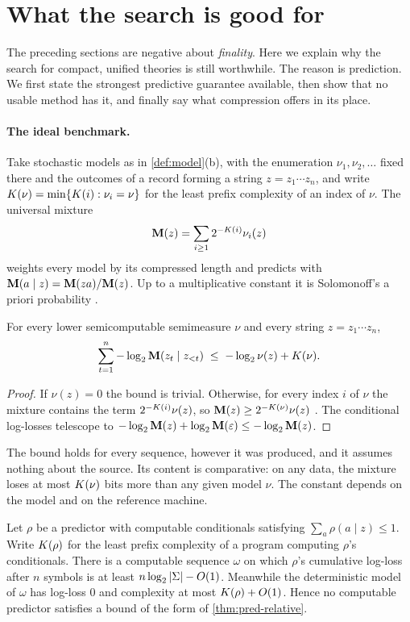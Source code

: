 \section{What the search is good for}\label{sec:predict}

The preceding sections are negative about \emph{finality}. Here we explain why the
search for compact, unified theories is still worthwhile. The reason is prediction. We
first state the strongest predictive guarantee available, then show that no usable
method has it, and finally say what compression offers in its place.

\paragraph{The ideal benchmark.}
Take stochastic models as in \cref{def:model}(b), with the enumeration
$\nu_1,\nu_2,\ldots$ fixed there and the outcomes of a record forming a string
$z=z_1\cdots z_n$, and write $K(\nu)=\min\{K(i):\nu_i=\nu\}$ for
the least prefix complexity of an index of $\nu$. The universal mixture
\[
  \mathbf{M}(z)=\sum_{i\ge1}2^{-K(i)}\nu_i(z)
\]
weights every model by its compressed length and predicts with
$\mathbf{M}(a\mid z)=\mathbf{M}(za)/\mathbf{M}(z)$. Up to a multiplicative constant it is Solomonoff's
a priori probability \citep{solomonoff1978,li-vitanyi2019}.

\begin{theorem}\label{thm:pred-relative}
For every lower semicomputable semimeasure $\nu$ and every string $z=z_1\cdots z_n$,
\[
  \sum_{t=1}^{n}-\log_2\mathbf{M}(z_t\mid z_{<t})\;\le\;-\log_2\nu(z)+K(\nu).
\]
\end{theorem}

\begin{proof}
If $\nu(z)=0$ the bound is trivial. Otherwise, for every index $i$ of $\nu$ the mixture
contains the term $2^{-K(i)}\nu(z)$, so $\mathbf{M}(z)\ge2^{-K(\nu)}\nu(z)$
\citep[Ch.~4]{li-vitanyi2019}. The conditional
log-losses telescope to $-\log_2\mathbf{M}(z)+\log_2\mathbf{M}(\varepsilon)\le-\log_2\mathbf{M}(z)$.
\end{proof}

The bound holds for every sequence, however it was produced, and it assumes nothing
about the source. Its content is comparative: on any data, the mixture loses at most
$K(\nu)$ bits more than any given model $\nu$. The constant depends on the model and
on the reference machine.

\begin{proposition}\label{pred:prop:no-computable}
Let $\rho$ be a predictor with computable conditionals satisfying
$\sum_a\rho(a\mid z)\le1$. Write $K(\rho)$ for the least prefix complexity of a program computing $\rho$'s
conditionals. There is a computable sequence $\omega$ on which $\rho$'s
cumulative log-loss after $n$ symbols is at least $n\log_2|\Sigma|-O(1)$. Meanwhile the
deterministic model of $\omega$ has log-loss $0$ and complexity at most
$K(\rho)+O(1)$. Hence no computable predictor satisfies a bound of the form of
\cref{thm:pred-relative}.
\end{proposition}

